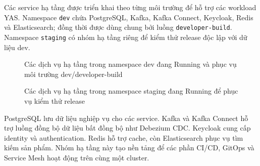Các service hạ tầng được triển khai theo từng môi trường để hỗ trợ các workload YAS. Namespace \texttt{dev} chứa PostgreSQL, Kafka, Kafka Connect, Keycloak, Redis và Elasticsearch; đồng thời được dùng chung bởi luồng \texttt{developer-build}. Namespace \texttt{staging} có nhóm hạ tầng riêng để kiểm thử release độc lập với dữ liệu dev.

\begin{figure}[H]
\centering
{}
\caption{Các dịch vụ hạ tầng trong namespace dev đang Running và phục vụ môi trường dev/developer-build}
\end{figure}

\begin{figure}[H]
\centering
{}
\caption{Các dịch vụ hạ tầng trong namespace staging đang Running để phục vụ kiểm thử release}
\end{figure}

PostgreSQL lưu dữ liệu nghiệp vụ cho các service. Kafka và Kafka Connect hỗ trợ luồng đồng bộ dữ liệu bất đồng bộ như Debezium CDC. Keycloak cung cấp identity và authentication. Redis hỗ trợ cache, còn Elasticsearch phục vụ tìm kiếm sản phẩm. Nhóm hạ tầng này tạo nền tảng để các phần CI/CD, GitOps và Service Mesh hoạt động trên cùng một cluster.
